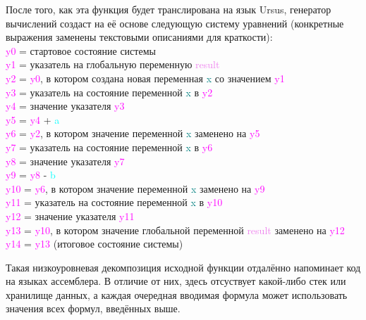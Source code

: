 \documentclass[../diploma.tex]{subfiles}
\begin{document}
После того, как эта функция будет транслирована на язык Ursus, генератор вычислений создаст на её основе следующую систему уравнений (конкретные выражения заменены текстовыми описаниями для краткости):
\bigskip\\
\newenvironment{allintypewriter}{\ttfamily}{\par}
\begin{allintypewriter}
\textcolor{magenta}{y0} = стартовое состояние системы\\
\textcolor{magenta}{y1} = указатель на глобальную переменную \textcolor{violet}{result}\\
\textcolor{magenta}{y2} = \textcolor{magenta}{y0}, в котором создана новая переменная \textcolor{teal}{x} со значением \textcolor{magenta}{y1}\\
\textcolor{magenta}{y3} = указатель на состояние переменной \textcolor{teal}{x} в \textcolor{magenta}{y2}\\
\textcolor{magenta}{y4} = значение указателя \textcolor{magenta}{y3}\\
\textcolor{magenta}{y5} = \textcolor{magenta}{y4} + \textcolor{cyan}{a}\\
\textcolor{magenta}{y6} = \textcolor{magenta}{y2}, в котором значение переменной \textcolor{teal}{x} заменено на \textcolor{magenta}{y5}\\
\textcolor{magenta}{y7} = указатель на состояние переменной \textcolor{teal}{x} в \textcolor{magenta}{y6}\\
\textcolor{magenta}{y8} = значение указателя \textcolor{magenta}{y7}\\
\textcolor{magenta}{y9} = \textcolor{magenta}{y8} - \textcolor{cyan}{b}\\
\textcolor{magenta}{y10} = \textcolor{magenta}{y6}, в котором значение переменной \textcolor{teal}{x} заменено на \textcolor{magenta}{y9}\\
\textcolor{magenta}{y11} = указатель на состояние переменной \textcolor{teal}{x} в \textcolor{magenta}{y10}\\
\textcolor{magenta}{y12} = значение указателя \textcolor{magenta}{y11}\\
\textcolor{magenta}{y13} = \textcolor{magenta}{y10}, в котором значение глобальной переменной \textcolor{violet}{result} заменено на \textcolor{magenta}{y12}\\
\textcolor{magenta}{y14} = \textcolor{magenta}{y13} (итоговое состояние системы)
\end{allintypewriter}
\bigskip

Такая низкоуровневая декомпозиция исходной функции отдалённо напоминает код на языках ассемблера. В отличие от них, здесь отсуствует какой-либо стек или хранилище данных, а каждая очередная вводимая формула может использовать значения всех формул, введённых выше.
\end{document}
